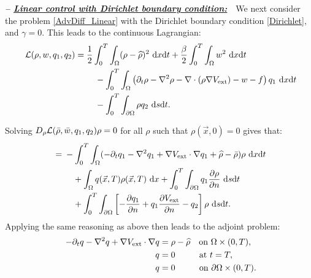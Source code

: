 \vspace{0.75em}

\textbf{\emph{-- \underline{Linear control with Dirichlet boundary condition:}}}~~We next consider the problem \eqref{AdvDiff_Linear} with the Dirichlet boundary condition \eqref{Dirichlet}, and $\gamma = 0$. This leads to the continuous Lagrangian:
\begin{align}
\ \label{Lagrangian_Linear} \mathcal{L}(\rho,w,\adj_1,\adj_2)={}&\frac{1}{2}\int_0^T\int_{\Omega}(\rho-\widehat{\rho})^2~{\rm d}x{\rm d}t+\frac{\beta}{2}\int_0^T\int_{\Omega}w^2~{\rm d}x{\rm d}t \\
\ \nonumber &\quad-\int_0^T\int_{\Omega}\left(\partial_{t}\rho-\nabla^{2}\rho-\nabla\cdot(\rho\nabla{}V_{\text{ext}})-w-f\right)\adj_1~{\rm d}x{\rm d}t \\
\ \nonumber &\quad-\int_0^T\int_{\partial\Omega}\rho{}\adj_2~{\rm d}s{\rm d}t.
\end{align}

Solving $D_{\rho}\mathcal{L}(\bar{\rho},\bar{w},q_1,q_2)\rho=0$ for all $\rho$ such that $\rho(\vec{x},0)=0$ gives that:
\begin{align}
\ \label{OptCondrho_Linear} ={}&-\int_0^T\int_{\Omega}(-\partial_{t}\adj_{1}-\nabla^{2}\adj_{1}+\nabla{}V_{\text{ext}}\cdot\nabla{}\adj_{1}+\widehat{\rho}-\bar{\rho})\rho~{\rm d}x{\rm d}t \\
\ \nonumber &\quad+\int_{\Omega}\adj(\vec{x},T)\rho(\vec{x},T)~{\rm d}x+\int_0^T\int_{\partial\Omega}\adj_1\frac{\partial\rho}{\partial{}n}~{\rm d}s{\rm d}t \\
\ \nonumber &\quad+\int_0^T\int_{\partial\Omega}\left[-\frac{\partial{}\adj_1}{\partial{}n}+\adj_{1}\frac{\partial{}V_{\text{ext}}}{\partial{}n}-\adj_2\right]\rho~{\rm d}s{\rm d}t.
\end{align}
Applying the same reasoning as above then leads to the adjoint problem:
\begin{align}
\ \label{Adjoint_Linear} -\partial_{t}\adj-\nabla^{2}\adj+\nabla{}V_{\text{ext}}\cdot\nabla{}\adj={}&\rho-\widehat{\rho}\quad\text{on }\Omega\times(0,T), \\
\ \nonumber \adj={}&0\quad\hspace{1.8em}\text{at }t=T, \\
\ \nonumber \adj={}&0\quad\hspace{1.8em}\text{on }\partial\Omega\times(0,T).
\end{align}


